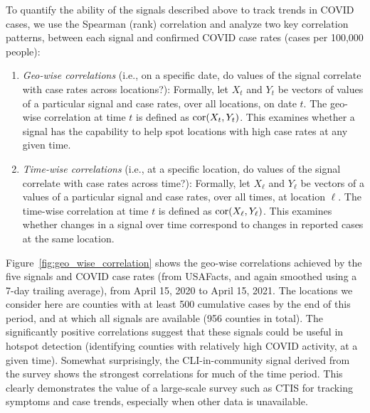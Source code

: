 \documentclass[9pt,twocolumn,twoside,lineno]{pnas-new}
\begin{document}
To quantify the ability of the signals described above to track trends in COVID
cases, we use the Spearman (rank) correlation and analyze two key correlation
patterns, between each signal and confirmed COVID case rates (cases per 100,000
people):
\begin{enumerate}
\item \textit{Geo-wise correlations} (i.e., on a specific date, do values of the
  signal correlate with case rates across locations?): Formally, let $X_t$ and
  $Y_t$ be vectors of values of a particular signal and case rates, over all
  locations, on date $t$. The geo-wise correlation at time $t$ is defined as
  $\mathrm{cor}(X_t, Y_t)$. This examines whether a signal has the capability to help
  spot locations with high case rates at any given time.

\item \textit{Time-wise correlations} (i.e., at a specific location, do values
  of the signal correlate with case rates across time?): Formally, let $X_\ell$
  and $Y_\ell$ be vectors of a values of a particular signal and case rates,
  over all times, at location $\ell$. The time-wise correlation at time $t$ is
  defined as $\mathrm{cor}(X_\ell, Y_\ell)$. This examines whether changes in a signal
  over time correspond to changes in reported cases at the same location.
\end{enumerate}

Figure~\ref{fig:geo_wise_correlation} shows the geo-wise correlations achieved
by the five signals and COVID case rates (from USAFacts, and again smoothed
using a 7-day trailing average), from April 15, 2020 to April 15, 2021. The
locations we consider here are counties with at least 500 cumulative cases by
the end of this period, and at which all signals are available (956 counties in
total). The  significantly positive correlations suggest that these signals 
could be useful in hotspot detection  (identifying counties with relatively high
COVID activity, at a given time). Somewhat surprisingly, the CLI-in-community
signal derived from the survey shows the strongest correlations for much of the
time period. This clearly demonstrates the value of a large-scale survey such as
CTIS for tracking symptoms and case trends, especially when other data is
unavailable.
\end{document}
